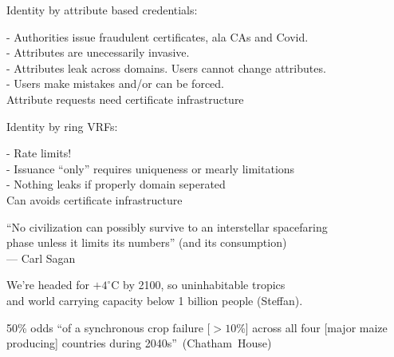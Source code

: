 \documentclass{beamer}
\begin{document}
\begin{frame}

Identity by attribute based credentials: \bigskip

- Authorities issue fraudulent certificates, ala CAs and Covid. \\ \smallskip
- Attributes are unecessarily invasive. \\ \smallskip
- Attributes leak across domains.  Users cannot change attributes. \\ \smallskip
- Users make mistakes and/or can be forced. \\ \medskip
\hspace{30pt}  {\color{red} Attribute requests need certificate infrastructure}

\bigskip\smallskip

Identity by ring VRFs: \\ \smallskip

- Rate limits! \\ \smallskip
- Issuance ``only'' requires uniqueness or mearly limitations \\ \smallskip
- Nothing leaks if properly domain seperated \\ \smallskip
\hspace{30pt}  {\color{green}  Can avoids certificate infrastructure}

\end{frame}


\begin{frame}
 
``No civilization can possibly survive to an interstellar spacefaring \\ \smallskip
\hspace{1pt} phase unless it limits its numbers'' (and its consumption) \\ \medskip
\hspace{1pt} --- Carl Sagan

\bigskip\bigskip 

We're headed for $+4^{\circ}$C by 2100, so uninhabitable tropics \\
\hspace{10pt} and world carrying capacity below 1 billion people (Steffan). \\ \bigskip

50\% odds ``of a synchronous crop failure [$>10$\%] across all four [major maize producing] countries during 2040s''~(Chatham~House) \\

\end{frame}
\end{document}
